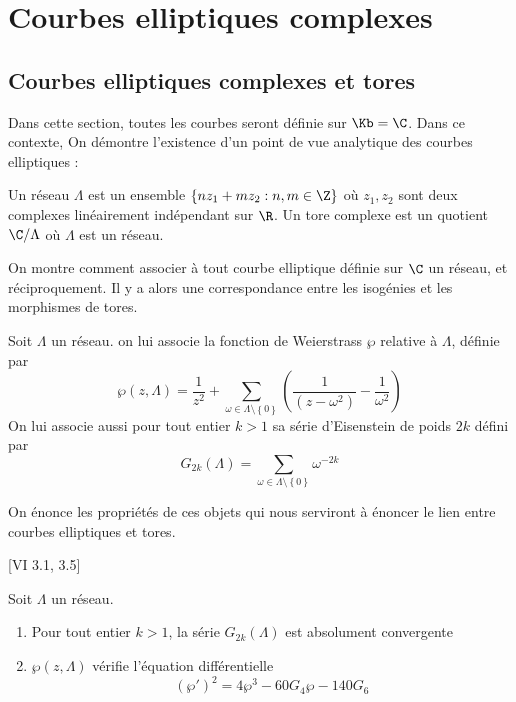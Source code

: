\section{Courbes elliptiques complexes}










\subsection{Courbes elliptiques complexes et tores}

Dans cette section, toutes les courbes seront définie sur $\Kb = \C$. Dans ce contexte, On démontre l'existence d'un point de vue analytique des courbes elliptiques :

\begin{Def}
	Un réseau $\Lambda$ est un ensemble $\left\lbrace nz_1 + mz_2 : n,m\in\Z\right\rbrace $ où $z_1 ,z_2$ sont deux complexes linéairement indépendant sur $\R$. Un tore complexe est un quotient $\C/\Lambda$ où $\Lambda$ est un réseau. 
	
\end{Def}

On montre comment associer à tout courbe elliptique définie sur $\C$ un réseau, et réciproquement. Il y a alors une correspondance entre les isogénies et les morphismes de tores. 

\begin{Def}
	Soit $\Lambda$ un réseau. on lui associe la fonction de Weierstrass $\wp$ relative à $\Lambda$, définie par
	\begin{equation*}
		\wp(z,\Lambda) = \frac{1}{z^2} + \sum_{\omega\in\Lambda\setminus\left\lbrace 0\right\rbrace }\left( \frac{1}{\left( z - \omega^2\right)} - \frac{1}{\omega^{2}} \right) 
	\end{equation*}
	On lui associe aussi pour tout entier $k>1$ sa série d'Eisenstein de poids $2k$ défini par
	\begin{equation*}
		G_{2k}(\Lambda) = \sum_{\omega\in\Lambda\setminus\left\lbrace 0\right\rbrace }\omega^{-2k}
	\end{equation*}
\end{Def}

On énonce les propriétés de ces objets qui nous serviront à énoncer le lien entre courbes elliptiques et tores.

\begin{Prop}\cite{Sil09}[VI 3.1, 3.5]
	
	Soit $\Lambda$ un réseau.
	\begin{enumerate}
		\item Pour tout entier $k>1$, la série $G_{2k}(\Lambda)$ est absolument convergente
		\item $\wp(z,\Lambda)$ vérifie l'équation différentielle
		\begin{equation*}
			(\wp')^{2} = 4\wp^{3} - 60G_{4}\wp - 140G_{6}
		\end{equation*}
	\end{enumerate}
\end{Prop}

